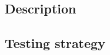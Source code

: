 \documentclass{article}
\begin{document}
	\subsection{Description}
	
	\subsection{Testing strategy}
%	
%	
%	
%	
%	
%	
%	
%	
%	
%	
\end{document}
